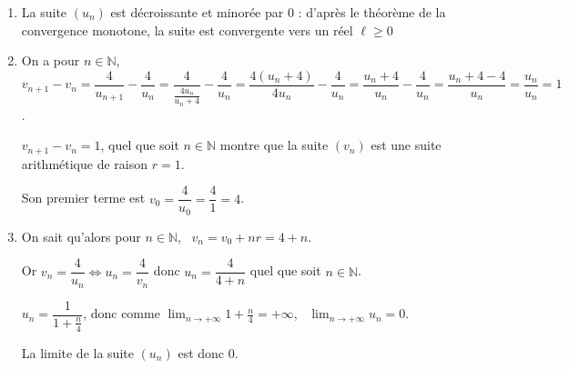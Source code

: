 \documentclass[10pt]{article}
\providecommand{\N}{\mathbb{N}}
\begin{document}
\begin{enumerate}
On a donc quel que soit $n \in \N$, \, $u_{n+1} - u_n < 0$ : la suite $\left(u_n\right)$ est décroissante.
\item 
La suite $\left(u_n\right)$ est décroissante et minorée par $0$ : d'après le théorème de la convergence monotone, la suite est convergente vers un réel $\ell \geqslant 0$

\item 






On a pour $n \in \N$, \\$v_{n+1} - v_n = \dfrac{4}{u_{n+1}} - \dfrac{4}{u_n} = \dfrac{4}{\frac{4u_n}{u_n + 4}} - \dfrac{4}{u_n} = \dfrac{4\left(u_n + 4 \right)}{4u_n} - \dfrac{4}{u_n} = \dfrac{u_n + 4}{u_n} - \dfrac{4}{u_n} = \dfrac{u_n + 4 - 4}{u_n} = \dfrac{u_n}{u_n} = 1$.

$v_{n+1} - v_n = 1$, quel que soit $n \in \N$ montre que la suite $\left(v_n\right)$ est une suite arithmétique de raison $r = 1$.

Son premier terme est $v_0 = \dfrac{4}{u_0} = \dfrac{4}{1} = 4$.

\item 
On sait qu'alors pour $n \in \N$, \, $v_n = v_0 + nr = 4 + n$.

Or $v_n = \dfrac{4}{u_n} \iff u_n = \dfrac{4}{v_n}$ donc $u_n = \dfrac{4}{4 + n}$ quel que soit $n \in \N$.

$u_n = \dfrac{1}{1 + \frac{n}{4}}$, donc comme $\displaystyle\lim_{n \to + \infty} 1 + \frac{n}{4} = + \infty$, \, $\displaystyle\lim_{n \to + \infty} u_n = 0$.


La limite de la suite $\left(u_n\right)$ est donc $0$.
\end{enumerate}

\bigskip
\end{document}
